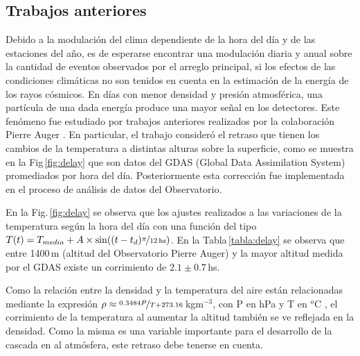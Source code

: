\subsection{Trabajos anteriores}

Debido a la modulación del clima dependiente de la hora del día y de las estaciones del año, es de esperarse encontrar una modulación diaria y anual sobre la cantidad de eventos observados por el arreglo principal, si los efectos de las condiciones climáticas no son tenidos en cuenta en la estimación de la energía de los rayos cósmicos. En días con menor densidad y presión atmosférica, una partícula de una dada energía produce una mayor señal en los detectores. Este fenómeno fue estudiado por trabajos anteriores realizados por la colaboración Pierre Auger \cite{aab2017impact} \cite{collaboration2009atmospheric}. En particular, el trabajo \cite{aab2017impact} consideró el retraso que tienen los cambios de  la temperatura a distintas alturas sobre la superficie, como se muestra en la Fig\,\ref{fig:delay} que son datos del GDAS (Global Data Assimilation System) promediados por hora del día. Posteriormente esta corrección fue implementada en el proceso  de análisis de datos del Observatorio.


En la Fig.\,\ref{fig:delay} se observa que los ajustes realizados a las variaciones de la temperatura  según la hora del día con una función del tipo $T(t) = T_{media} + A\times \sin((t-t_d)\nicefrac{\pi}{12\,\text{hs}})$.  En la Tabla\,\ref{tabla:delay} se observa que entre 1400\,m (altitud del Observatorio Pierre Auger) y la mayor altitud medida por el GDAS existe un corrimiento de $2.1\pm0.7\,$hs.

Como la relación entre la densidad y la temperatura del aire están relacionadas mediante la expresión $\rho \approx \nicefrac{0.3484P}{T +273.16}\,$kgm$^{-3}$, con P en hPa y T en  $^o$C \cite{aab2017impact}, el corrimiento de la temperatura al aumentar la altitud también se ve reflejada en la densidad. Como la misma es una variable importante para el desarrollo de la cascada en al atmósfera, este retraso debe tenerse en cuenta.

